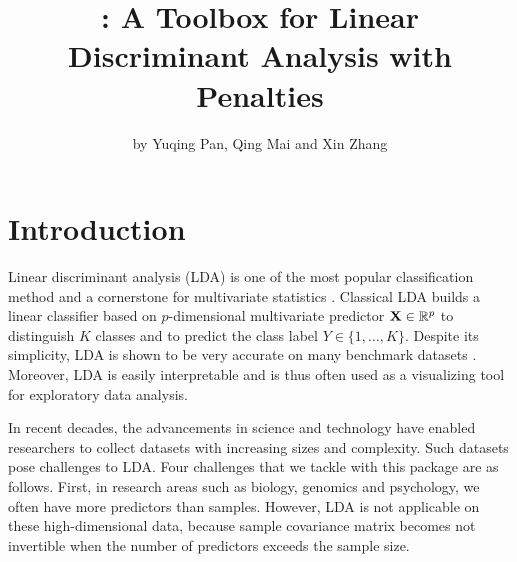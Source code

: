 \title{: A Toolbox for Linear Discriminant Analysis with Penalties}
\author{by Yuqing Pan, Qing Mai and Xin Zhang}

\maketitle


 \section{Introduction} \label{sec:intro}

Linear discriminant analysis (LDA) is one of the most popular classification method and a cornerstone for multivariate statistics \citep[e.g]{michie1994machine}. Classical LDA builds a linear classifier based on $p$-dimensional multivariate predictor $\mathbf{X}\in\mathbb{R}^p$ to distinguish $K$ classes and to predict the class label $Y\in\{1,\ldots,K\}$. Despite its simplicity, LDA is shown to be very accurate on many benchmark datasets \citep{lim2000comparison,dettling2004bagboosting,hand2006classifier}. Moreover, LDA is easily interpretable and is thus often used as a visualizing tool for exploratory data analysis.


In recent decades, the advancements in science and technology have enabled researchers to collect datasets with increasing sizes and complexity. Such datasets pose challenges to LDA. Four challenges that we tackle with this package are as follows. First, in research areas such as biology, genomics and psychology, we often have more predictors than samples. However, LDA is not applicable on these high-dimensional data, because sample covariance matrix becomes not invertible when the number of predictors exceeds the sample size. 

